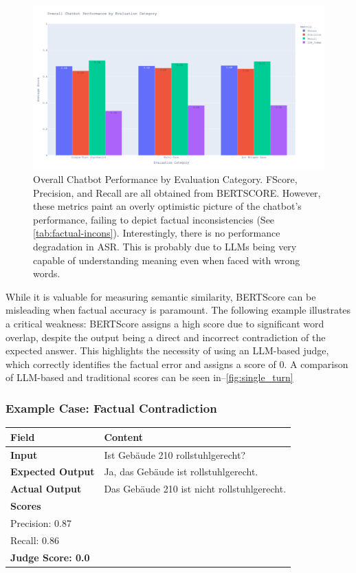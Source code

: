 \documentclass{article}
\begin{document}
\begin{figure}[htb]
    \centering
    \includegraphics[width=1.0\linewidth]{docs/phase2/plots/overall_performance.png}
    \caption{Overall Chatbot Performance by Evaluation Category. FScore, Precision, and Recall are all obtained from BERTSCORE. However, these metrics paint an overly optimistic picture of the chatbot's performance, failing to depict factual inconsistencies (See \cref{tab:factual-incons}). Interestingly, there is no performance degradation in ASR. This is probably due to LLMs being very capable of understanding meaning even when faced with wrong words.}
    \label{fig:overall_perf}
\end{figure}

While it is valuable for measuring semantic similarity, BERTScore can be misleading when factual accuracy is paramount. The following example illustrates a critical weakness: BERTScore assigns a high score due to significant word overlap, despite the output being a direct and incorrect contradiction of the expected answer. This highlights the necessity of using an LLM-based judge, which correctly identifies the factual error and assigns a score of 0. A comparison of LLM-based and traditional scores can be seen in–\cref{fig:single_turn}\\

\subsubsection*{Example Case: Factual Contradiction}
\label{tab:factual-incons}
\begin{longtable}{p{} p{}}

\toprule
\textbf{Field} & \textbf{Content} \\
\midrule
\endhead
\bottomrule
\endfoot
\textbf{Input} & Ist Gebäude 210 rollstuhlgerecht? \\
\textbf{Expected Output} & Ja, das Gebäude ist rollstuhlgerecht. \\
\textbf{Actual Output} & Das Gebäude 210 ist nicht rollstuhlgerecht. \\
\midrule
\textbf{Scores} &
\begin{tabular}{@{}l@{}}
FScore: 0.87 \\
Precision: 0.87 \\
Recall: 0.86 \\
\textbf{Judge Score: 0.0}
\end{tabular}
\\
\end{longtable}
\end{document}
